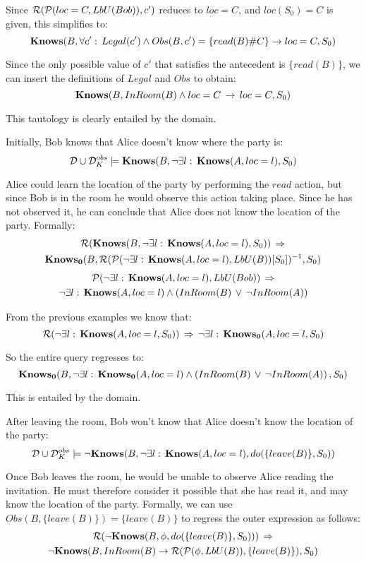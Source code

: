 Since $\mathcal{R}(\mathcal{P}(loc=C,LbU(Bob)),c')$ reduces to $loc=C$, and $loc(S_{0})=C$
is given, this simplifies to:\[
\mathbf{Knows}(B,\forall c':\, Legal(c')\wedge Obs(B,c')=\{read(B)\#C\}\rightarrow loc=C,S_{0})\]


Since the only possible value of $c'$ that satisfies the antecedent
is $\{read(B)\}$, we can insert the definitions of $Legal$ and $Obs$
to obtain:\[
\mathbf{Knows}(B,InRoom(B)\wedge loc=C\,\rightarrow\, loc=C,S_{0})\]


This tautology is clearly entailed by the domain.\\

\begin{example}
Initially, Bob knows that Alice doesn't know where the party is:\[
\mathcal{D}\cup\mathcal{D}_{K}^{obs}\models\mathbf{Knows}(B,\neg\exists l:\,\mathbf{Knows}(A,loc=l),S_{0})\]

\end{example}
Alice could learn the location of the party by performing the $read$
action, but since Bob is in the room he would observe this action
taking place. Since he has not observed it, he can conclude that Alice
does not know the location of the party. Formally:\begin{multline*}
\mathcal{R}(\mathbf{Knows}(B,\neg\exists l:\,\mathbf{Knows}(A,loc=l),S_{0}))\,\Rightarrow\\
\mathbf{Knows_{0}}(B,\mathcal{R}(\mathcal{P}(\neg\exists l:\,\mathbf{Knows}(A,loc=l),LbU(B))[S_{0}])^{-1},S_{0})\end{multline*}
 \begin{multline*}
\mathcal{P}(\neg\exists l:\,\mathbf{Knows}(A,loc=l),LbU(Bob))\,\Rightarrow\\
\neg\exists l:\,\mathbf{Knows}(A,loc=l)\wedge\left(InRoom(B)\,\vee\,\neg InRoom(A)\right)\end{multline*}


From the previous examples we know that:\[
\mathcal{R}(\neg\exists l:\,\mathbf{Knows}(A,loc=l,S_{0}))\,\Rightarrow\,\neg\exists l:\,\mathbf{Knows_{0}}(A,loc=l,S_{0})\]


So the entire query regresses to:\[
\mathbf{Knows_{0}}(B,\neg\exists l:\,\mathbf{Knows_{0}}(A,loc=l)\wedge\left(InRoom(B)\,\vee\,\neg InRoom(A)\right),S_{0})\]


This is entailed by the domain.

\newpage{} 
\begin{example}
After leaving the room, Bob won't know that Alice doesn't know the
location of the party:\[
\mathcal{D}\cup\mathcal{D}_{K}^{obs}\models\mathbf{\neg Knows}(B,\neg\exists l:\,\mathbf{Knows}(A,loc=l),do(\{leave(B)\},S_{0}))\]

\end{example}
Once Bob leaves the room, he would be unable to observe Alice reading
the invitation. He must therefore consider it possible that she has
read it, and may know the location of the party. Formally, we can
use $Obs(B,\{leave(B)\})=\{leave(B)\}$ to regress the outer expression
as follows:\begin{multline*}
\mathcal{R}(\neg\mathbf{Knows}(B,\phi,do(\{leave(B)\},S_{0})))\,\Rightarrow\\
\neg\mathbf{Knows}(B,InRoom(B)\rightarrow\mathcal{R}(\mathcal{P}(\phi,LbU(B)),\{leave(B)\}),S_{0})\end{multline*}



